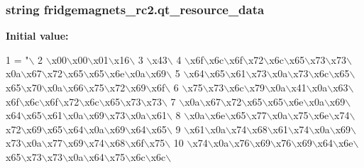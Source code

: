 \subsubsection[{qt\+\_\+resource\+\_\+data}]{\setlength{\rightskip}{0pt plus 5cm}string fridgemagnets\+\_\+rc2.\+qt\+\_\+resource\+\_\+data}\label{namespacefridgemagnets__rc2_a79be954a7349df138ebcbfce50391a96}
{\bfseries Initial value\+:}
\begin{DoxyCode}
1 = \textcolor{stringliteral}{"\(\backslash\)}
2 \textcolor{stringliteral}{\(\backslash\)x00\(\backslash\)x00\(\backslash\)x01\(\backslash\)x16\(\backslash\)}
3 \textcolor{stringliteral}{\(\backslash\)x43\(\backslash\)}
4 \textcolor{stringliteral}{\(\backslash\)x6f\(\backslash\)x6c\(\backslash\)x6f\(\backslash\)x72\(\backslash\)x6c\(\backslash\)x65\(\backslash\)x73\(\backslash\)x73\(\backslash\)x0a\(\backslash\)x67\(\backslash\)x72\(\backslash\)x65\(\backslash\)x65\(\backslash\)x6e\(\backslash\)x0a\(\backslash\)x69\(\backslash\)}
5 \textcolor{stringliteral}{\(\backslash\)x64\(\backslash\)x65\(\backslash\)x61\(\backslash\)x73\(\backslash\)x0a\(\backslash\)x73\(\backslash\)x6c\(\backslash\)x65\(\backslash\)x65\(\backslash\)x70\(\backslash\)x0a\(\backslash\)x66\(\backslash\)x75\(\backslash\)x72\(\backslash\)x69\(\backslash\)x6f\(\backslash\)}
6 \textcolor{stringliteral}{\(\backslash\)x75\(\backslash\)x73\(\backslash\)x6c\(\backslash\)x79\(\backslash\)x0a\(\backslash\)x41\(\backslash\)x0a\(\backslash\)x63\(\backslash\)x6f\(\backslash\)x6c\(\backslash\)x6f\(\backslash\)x72\(\backslash\)x6c\(\backslash\)x65\(\backslash\)x73\(\backslash\)x73\(\backslash\)}
7 \textcolor{stringliteral}{\(\backslash\)x0a\(\backslash\)x67\(\backslash\)x72\(\backslash\)x65\(\backslash\)x65\(\backslash\)x6e\(\backslash\)x0a\(\backslash\)x69\(\backslash\)x64\(\backslash\)x65\(\backslash\)x61\(\backslash\)x0a\(\backslash\)x69\(\backslash\)x73\(\backslash\)x0a\(\backslash\)x61\(\backslash\)}
8 \textcolor{stringliteral}{\(\backslash\)x0a\(\backslash\)x6e\(\backslash\)x65\(\backslash\)x77\(\backslash\)x0a\(\backslash\)x75\(\backslash\)x6e\(\backslash\)x74\(\backslash\)x72\(\backslash\)x69\(\backslash\)x65\(\backslash\)x64\(\backslash\)x0a\(\backslash\)x69\(\backslash\)x64\(\backslash\)x65\(\backslash\)}
9 \textcolor{stringliteral}{\(\backslash\)x61\(\backslash\)x0a\(\backslash\)x74\(\backslash\)x68\(\backslash\)x61\(\backslash\)x74\(\backslash\)x0a\(\backslash\)x69\(\backslash\)x73\(\backslash\)x0a\(\backslash\)x77\(\backslash\)x69\(\backslash\)x74\(\backslash\)x68\(\backslash\)x6f\(\backslash\)x75\(\backslash\)}
10 \textcolor{stringliteral}{\(\backslash\)x74\(\backslash\)x0a\(\backslash\)x76\(\backslash\)x69\(\backslash\)x76\(\backslash\)x69\(\backslash\)x64\(\backslash\)x6e\(\backslash\)x65\(\backslash\)x73\(\backslash\)x73\(\backslash\)x0a\(\backslash\)x64\(\backslash\)x75\(\backslash\)x6c\(\backslash\)x6c\(\backslash\)}

\end{DoxyCode}
